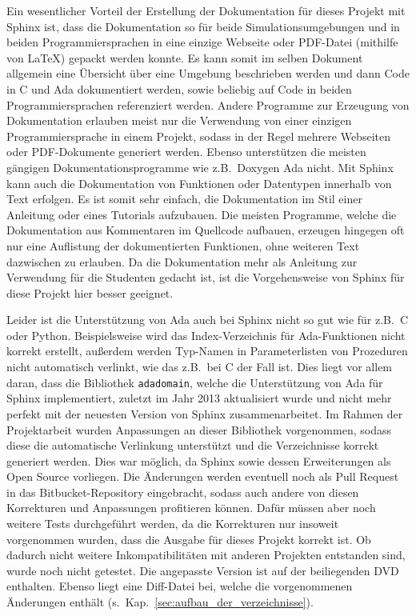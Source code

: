\documentclass[oneside]{elaboration}
\begin{document}
Ein wesentlicher Vorteil der Erstellung der Dokumentation für dieses Projekt mit
Sphinx ist, dass die Dokumentation so für beide Simulationsumgebungen und in
beiden Programmiersprachen in eine einzige Webseite oder PDF-Datei (mithilfe von
LaTeX) gepackt werden konnte. Es kann somit im selben Dokument allgemein eine
Übersicht über eine Umgebung beschrieben werden und dann Code in C und Ada
dokumentiert werden, sowie beliebig auf Code in beiden Programmiersprachen
referenziert werden. Andere Programme zur Erzeugung von Dokumentation erlauben
meist nur die Verwendung von einer einzigen Programmiersprache in einem Projekt,
sodass in der Regel mehrere Webseiten oder PDF-Dokumente generiert werden.
Ebenso unterstützen die meisten gängigen Dokumentationsprogramme wie z.B.\
Doxygen Ada nicht. Mit Sphinx kann auch die Dokumentation von Funktionen oder
Datentypen innerhalb von Text erfolgen. Es ist somit sehr einfach, die
Dokumentation im Stil einer Anleitung oder eines Tutorials aufzubauen. Die
meisten Programme, welche die Dokumentation aus Kommentaren im Quellcode
aufbauen, erzeugen hingegen oft nur eine Auflistung der dokumentierten
Funktionen, ohne weiteren Text dazwischen zu erlauben. Da die Dokumentation mehr
als Anleitung zur Verwendung für die Studenten gedacht ist, ist die
Vorgehensweise von Sphinx für diese Projekt hier besser geeignet.

Leider ist die Unterstützung von Ada auch bei Sphinx nicht so gut wie für z.B.\
C oder Python. Beispielsweise wird das Index-Verzeichnis für Ada-Funktionen
nicht korrekt erstellt, außerdem werden Typ-Namen in Parameterlisten von
Prozeduren nicht automatisch verlinkt, wie das z.B.\ bei C der Fall ist. Dies
liegt vor allem daran, dass die Bibliothek \texttt{adadomain}, welche die
Unterstützung von Ada für Sphinx implementiert, zuletzt im Jahr 2013
aktualisiert wurde und nicht mehr perfekt mit der neuesten Version von Sphinx
zusammenarbeitet. Im Rahmen der Projektarbeit wurden Anpassungen an dieser
Bibliothek vorgenommen, sodass diese die automatische Verlinkung unterstützt und
die Verzeichnisse korrekt generiert werden. Dies war möglich, da Sphinx sowie
dessen Erweiterungen als Open Source vorliegen. Die Änderungen werden eventuell
noch als Pull Request in das Bitbucket-Repository eingebracht, sodass auch
andere von diesen Korrekturen und Anpassungen profitieren können. Dafür müssen
aber noch weitere Tests durchgeführt werden, da die Korrekturen nur insoweit
vorgenommen wurden, dass die Ausgabe für dieses Projekt korrekt ist. Ob dadurch
nicht weitere Inkompatibilitäten mit anderen Projekten entstanden sind, wurde
noch nicht getestet. Die angepasste Version ist auf der beiliegenden DVD
enthalten. Ebenso liegt eine Diff-Datei bei, welche die vorgenommenen Änderungen
enthält (s.\ Kap.~\ref{sec:aufbau_der_verzeichnisse}).
\end{document}

